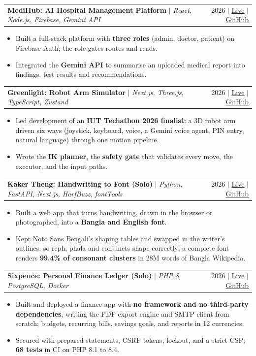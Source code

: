\documentclass[a4paper,10pt]{article}
\makeatletter
\newcommand{\resumeItem}[1]{
  \item\small{
    {#1 \vspace{-2pt}}
  }
}
\newcommand{\resumeProjectHeading}[2]{
    \item
    \begin{tabular*}{1.0\textwidth}{l@{\extracolsep{\fill}}r}
      \small#1 & \small #2 \\
    \end{tabular*}\vspace{-7pt}
}
\newcommand{\resumeItemListStart}{\begin{itemize}}
\newcommand{\resumeItemListEnd}{\end{itemize}\vspace{-7pt}}
\newcommand{\lnk}[2]{\href{#1}{\underline{#2}}}
\makeatother
\begin{document}
      \resumeProjectHeading
          {\textbf{MediHub: AI Hospital Management Platform} $|$ \emph{React, Node.js, Firebase, Gemini API}}{2026 $|$ \lnk{https://ai-powered-hospital-management-syst.vercel.app/}{Live} $|$ \lnk{https://github.com/SamisDone/AI-Powered-Hospital-Management-System}{GitHub}}
          \resumeItemListStart
            \resumeItem{Built a full-stack platform with \textbf{three roles} (admin, doctor, patient) on Firebase Auth; the role gates routes and reads.}
            \resumeItem{Integrated the \textbf{Gemini API} to summarise an uploaded medical report into findings, test results and recommendations.}
          \resumeItemListEnd

      \resumeProjectHeading
          {\textbf{Greenlight: Robot Arm Simulator} $|$ \emph{Next.js, Three.js, TypeScript, Zustand}}{2026 $|$ \lnk{https://greenlight-ptsd.vercel.app/}{Live} $|$ \lnk{https://github.com/SamisDone/GreenLight-IUT-Techathon-Hackathon}{GitHub}}
          \resumeItemListStart
            \resumeItem{Led development of an \textbf{IUT Techathon 2026 finalist}: a 3D robot arm driven six ways (joystick, keyboard, voice, a Gemini voice agent, PIN entry, natural language) through one motion pipeline.}
            \resumeItem{Wrote the \textbf{IK planner}, the \textbf{safety gate} that validates every move, the executor, and the input paths.}
          \resumeItemListEnd

      \resumeProjectHeading
          {\textbf{Kaker Theng: Handwriting to Font (Solo)} $|$ \emph{Python, FastAPI, Next.js, HarfBuzz, fontTools}}{2026 $|$ \lnk{https://kaker-theng-api.onrender.com/}{Live} $|$ \lnk{https://github.com/SamisDone/Kaker-Theng}{GitHub}}
          \resumeItemListStart
            \resumeItem{Built a web app that turns handwriting, drawn in the browser or photographed, into a \textbf{Bangla and English font}.}
            \resumeItem{Kept Noto Sans Bengali's shaping tables and swapped in the writer's outlines, so reph, phala and conjuncts shape correctly; a complete font renders \textbf{99.4\% of consonant clusters} in 28M words of Bangla Wikipedia.}
          \resumeItemListEnd

      \resumeProjectHeading
          {\textbf{Sixpence: Personal Finance Ledger (Solo)} $|$ \emph{PHP 8, PostgreSQL, Docker}}{2026 $|$ \lnk{https://sixpence.onrender.com/}{Live} $|$ \lnk{https://github.com/SamisDone/SixPence}{GitHub}}
          \resumeItemListStart
            \resumeItem{Built and deployed a finance app with \textbf{no framework and no third-party dependencies}, writing the PDF export engine and SMTP client from scratch; budgets, recurring bills, savings goals, and reports in 12 currencies.}
            \resumeItem{Secured with prepared statements, CSRF tokens, lockout, and a strict CSP; \textbf{68 tests} in CI on PHP 8.1 to 8.4.}
          \resumeItemListEnd
\end{document}
